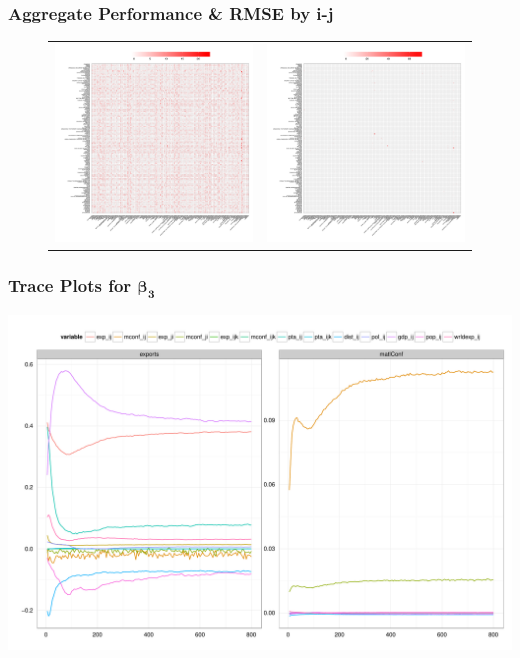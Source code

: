\documentclass[10pt, compress]{beamer}
\begin{document}
\frame
{
\frametitle{Aggregate Performance \& RMSE by i-j}
  
  \vspace*{-.3in}
  \begin{figure}[ht]
  \centering
    \begin{tabular}{cc}
      \includegraphics[width=.45\textwidth]{expiperf.pdf} & 
      \includegraphics[width=.45\textwidth]{mconfiperf.pdf}
    \end{tabular}
  \end{figure}
}

\frame
{
\frametitle{Trace Plots for $\boldsymbol{\beta_{3}}$}
  \centering
  \includegraphics[width=1\textwidth]{trace.pdf}
}

\end{document}
